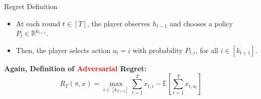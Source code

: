 \documentclass{beamer}
\begin{document}





\begin{frame}{Regret Definition}

\begin{itemize}
    \item At each round \( t \in [T] \), the player observes \( h_{t-1} \) and chooses a policy \( P_t \in \mathbb{R}^{k_{t+1}} \).
    
    \item Then, the player selects action \( a_t = i \) with probability \( P_{t,i} \), for all \( i \in [k_{t+1}] \).
\end{itemize}

\vspace{2mm}

\textbf{Again, Definition of \textcolor{red}{Adversarial} Regret:}
\[
R_T(\pi, x) = \max_{i \in [k_{T+1}]} \sum_{t=1}^{T} x_{t,i} - \mathbb{E} \left[ \sum_{t=1}^{T} x_{t, a_t} \right]
\]

\end{frame} 



    
            
\end{document}
